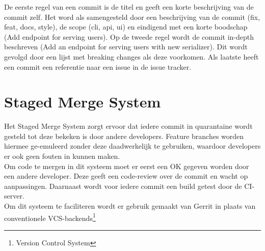 De eerste regel van een commit is de titel en geeft een korte beschrijving van de commit zelf. Het word als samengesteld door een beschrijving van de commit (fix, feat, docs, style), de scope (cli, api, ui) en eindigend met een korte boodschap (Add endpoint for serving users). Op de tweede regel wordt de commit in-depth beschreven (Add an endpoint for serving users with new serializer). Dit wordt gevolgd door een lijst met breaking changes als deze voorkomen. Als laatste heeft een commit een referentie naar een issue in de issue tracker.

\section{Staged Merge System}

Het Staged Merge System zorgt ervoor dat iedere commit in quarantaine wordt gesteld tot deze bekeken is door andere developers. Feature branches worden hiermee ge-emuleerd zonder deze daadwerkelijk te gebruiken, waardoor developers er ook geen fouten in kunnen maken. \\

Om code te mergen in dit systeem moet er eerst een OK gegeven worden door een andere developer. Deze geeft een code-review over de commit en wacht op aanpassingen. Daarnaast wordt voor iedere commit een build getest door de CI-server. \\

Om dit systeem te faciliteren wordt er gebruik gemaakt van Gerrit in plaats van conventionele VCS-backends\footnote{Version Control System}